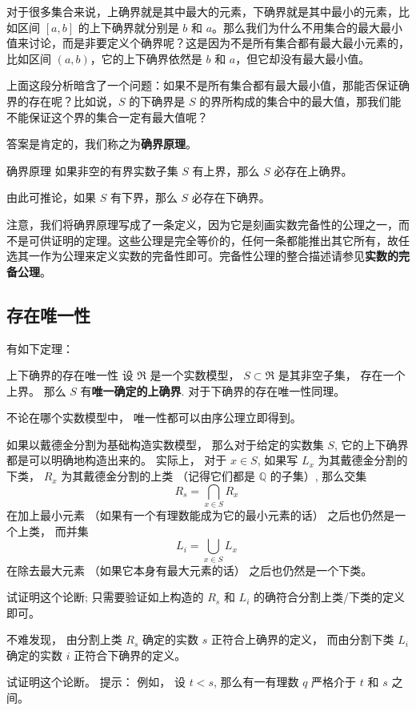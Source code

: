 对于很多集合来说，上确界就是其中最大的元素，下确界就是其中最小的元素，比如区间 $[a, b]$ 的上下确界就分别是 $b$ 和 $a$。那么我们为什么不用集合的最大最小值来讨论，而是非要定义个确界呢？这是因为不是所有集合都有最大最小元素的，比如区间 $(a, b)$，它的上下确界依然是 $b$ 和 $a$，但它却没有最大最小值。

上面这段分析暗含了一个问题：如果不是所有集合都有最大最小值，那能否保证确界的存在呢？比如说，$S$ 的下确界是 $S$ 的界所构成的集合中的最大值，那我们能不能保证这个界的集合一定有最大值呢？

答案是肯定的，我们称之为\textbf{确界原理}。

\begin{definition}{确界原理}\label{def_SupInf_3}
如果非空的有界实数子集 $S$ 有上界，那么 $S$ 必存在上确界。

由此可推论，如果 $S$ 有下界，那么 $S$ 必存在下确界。
\end{definition}

注意，我们将确界原理写成了一条定义，因为它是刻画实数完备性的公理之一，而不是可供证明的定理。这些公理是完全等价的，任何一条都能推出其它所有，故任选其一作为公理来定义实数的完备性即可。完备性公理的整合描述请参见\textbf{实数的完备公理}。

\subsection{存在唯一性}
有如下定理：

\begin{theorem}{上下确界的存在唯一性}
设 $\mathfrak{R}$ 是一个实数模型， $S\subset\mathfrak{R}$ 是其非空子集， 存在一个上界。 那么 $S$ 有\textbf{唯一确定的上确界}. 对于下确界的存在唯一性同理。
\end{theorem}

不论在哪个实数模型中， 唯一性都可以由序公理立即得到。

如果以戴德金分割为基础构造实数模型， 那么对于给定的实数集 $S$, 它的上下确界都是可以明确地构造出来的。 实际上， 对于 $x\in S$, 如果写 $L_x$ 为其戴德金分割的下类， $R_x$ 为其戴德金分割的上类 （记得它们都是 $\mathbb{Q}$ 的子集）, 那么交集
$$
R_s=\bigcap_{x\in S}R_x~
$$
在加上最小元素 （如果有一个有理数能成为它的最小元素的话） 之后也仍然是一个上类， 而并集
$$
L_i=\bigcup_{x\in S}L_x~
$$
在除去最大元素 （如果它本身有最大元素的话） 之后也仍然是一个下类。

\begin{exercise}{}
试证明这个论断; 只需要验证如上构造的 $R_s$ 和 $L_i$ 的确符合分割上类/下类的定义即可。
\end{exercise}

不难发现， 由分割上类 $R_s$ 确定的实数 $s$ 正符合上确界的定义， 而由分割下类 $L_i$ 确定的实数 $i$ 正符合下确界的定义。

\begin{exercise}{}
试证明这个论断。 提示： 例如， 设 $t<s$, 那么有一有理数 $q$ 严格介于 $t$ 和 $s$ 之间。 
\end{exercise}